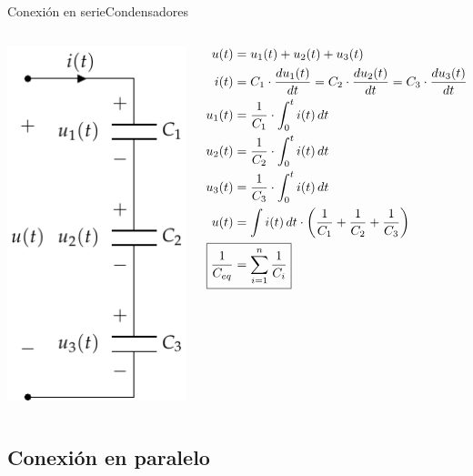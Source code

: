\documentclass[aspectratio=169, xcolor={usenames,svgnames,dvipsnames}]{beamer}
\begin{document}
\begin{frame}{Conexión en serie}{Condensadores}
\begin{columns}
\begin{column}{0.3\columnwidth}
\begin{center}
\includegraphics[height=0.85\textheight]{../figs/CondensadoresSerie.pdf}
\end{center}
\end{column}
\begin{column}{0.7\columnwidth}
\begin{align*}
  u(t) & = u_1(t) + u_2(t) + u_3(t)\\
  i(t) &= C_1 \cdot \frac{du_1(t)}{dt}= C_2 \cdot \frac{du_2(t)}{dt}= C_3 \cdot \frac{du_3(t)}{dt}\\
  u_1(t)&=\dfrac{1}{C_1}\cdot\int_{0}^{t} i(t)\, dt\\
  u_2(t)&=\dfrac{1}{C_2}\cdot\int_{0}^{t} i(t)\, dt\\
  u_3(t)&=\dfrac{1}{C_3}\cdot\int_{0}^{t} i(t)\, dt\\
  u(t)& = \int i(t)\,dt \cdot \left(\dfrac{1}{C_1}+\dfrac{1}{C_2}+\dfrac{1}{C_3}\right)\\
  \Aboxed{\frac{1}{C_{eq}} &= \sum_{i = 1}^n \frac{1}{C_i}}
\end{align*}
\end{column}
\end{columns}
\end{frame}

\subsection{Conexión en paralelo}
\end{document}
